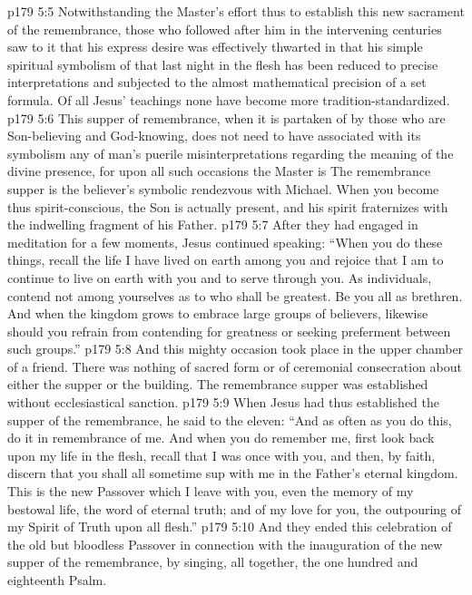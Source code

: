 \vs p179 5:5 Notwithstanding the Master’s effort thus to establish this new sacrament of the remembrance, those who followed after him in the intervening centuries saw to it that his express desire was effectively thwarted in that his simple spiritual symbolism of that last night in the flesh has been reduced to precise interpretations and subjected to the almost mathematical precision of a set formula. Of all Jesus’ teachings none have become more tradition\hyp{}standardized.
\vs p179 5:6 This supper of remembrance, when it is partaken of by those who are Son\hyp{}believing and God\hyp{}knowing, does not need to have associated with its symbolism any of man’s puerile misinterpretations regarding the meaning of the divine presence, for upon all such occasions the Master is  The remembrance supper is the believer’s symbolic rendezvous with Michael. When you become thus spirit\hyp{}conscious, the Son is actually present, and his spirit fraternizes with the indwelling fragment of his Father.
\pc \vs p179 5:7 After they had engaged in meditation for a few moments, Jesus continued speaking: \textcolor{ubdarkred}{“When you do these things, recall the life I have lived on earth among you and rejoice that I am to continue to live on earth with you and to serve through you. As individuals, contend not among yourselves as to who shall be greatest. Be you all as brethren. And when the kingdom grows to embrace large groups of believers, likewise should you refrain from contending for greatness or seeking preferment between such groups.”}
\vs p179 5:8 And this mighty occasion took place in the upper chamber of a friend. There was nothing of sacred form or of ceremonial consecration about either the supper or the building. The remembrance supper was established without ecclesiastical sanction.
\vs p179 5:9 When Jesus had thus established the supper of the remembrance, he said to the eleven: “And as often as you do this, do it in remembrance of me. And when you do remember me, first look back upon my life in the flesh, recall that I was once with you, and then, by faith, discern that you shall all sometime sup with me in the Father’s eternal kingdom. This is the new Passover which I leave with you, even the memory of my bestowal life, the word of eternal truth; and of my love for you, the outpouring of my Spirit of Truth upon all flesh.”
\vs p179 5:10 And they ended this celebration of the old but bloodless Passover in connection with the inauguration of the new supper of the remembrance, by singing, all together, the one hundred and eighteenth Psalm.
